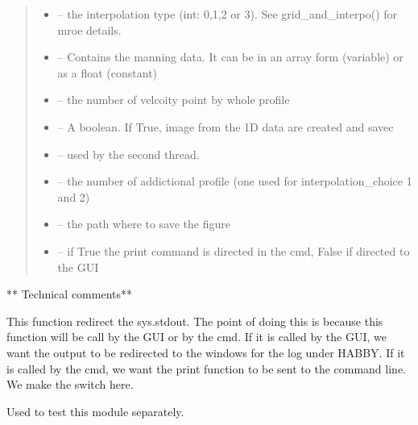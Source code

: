 \documentclass[letterpaper,10pt,english]{sphinxmanual}
\begin{document}
\begin{fulllineitems}
\begin{quote}
\begin{description}
\begin{itemize}
\item {} 
 -- the interpolation type (int: 0,1,2 or 3). See grid\_and\_interpo() for mroe details.

\item {} 
 -- Contains the manning data. It can be in an array form (variable) or as a float (constant)

\item {} 
 -- the number of velcoity point by whole profile

\item {} 
 -- A boolean. If True, image from the 1D data are created and savec

\item {} 
 -- used by the second thread.

\item {} 
 -- the number of addictional profile (one used for interpolation\_choice 1 and 2)

\item {} 
 -- the path where to save the figure

\item {} 
 -- if True the print command is directed in the cmd, False if directed to the GUI

\end{itemize}

\end{description}\end{quote}

** Technical comments**

This function redirect the sys.stdout. The point of doing this is because this function will be call by the GUI or
by the cmd. If it is called by the GUI, we want the output to be redirected to the windows for the log under HABBY.
If it is called by the cmd, we want the print function to be sent to the command line. We make the switch here.

\end{fulllineitems}


\begin{fulllineitems}
\label{\detokenize{index:src.mascaret.main}}
Used to test this module separately.

\end{fulllineitems}
\end{document}
